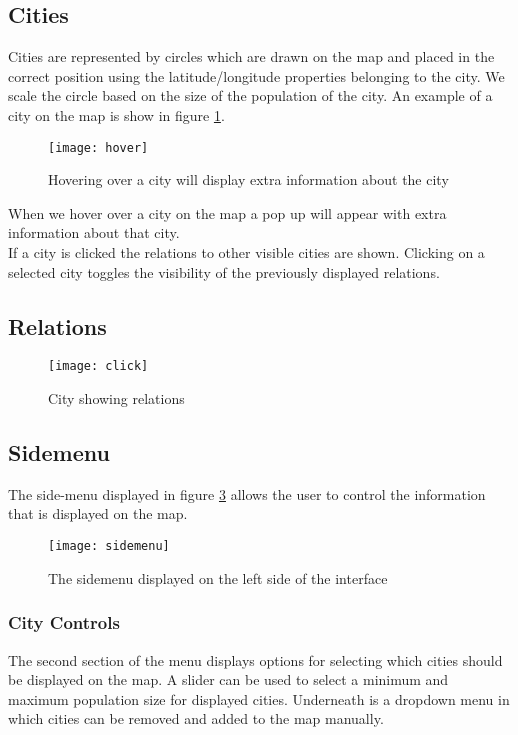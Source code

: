 \subsection{Cities}
Cities are represented by circles which are drawn on the map and placed in the correct position using the latitude/longitude properties belonging to the city. We scale the circle based on the size of the population of the city. An example of a city on the map is show in figure \ref{fig:map-city}.

\begin{figure}[H]
  \centering
  \texttt{[image: hover]}
  \caption{Hovering over a city will display extra information about the city}
  \label{fig:map-city}
\end{figure}

When we hover over a city on the map a pop up will appear with extra information about that city.\\
If a city is clicked the relations to other visible cities are shown. Clicking on a selected city toggles the visibility of the previously displayed relations.

\subsection{Relations}


\begin{figure}[H]
  \centering
  \texttt{[image: click]}
  \caption{City showing relations}
  \label{fig:sub2}
\end{figure}

\subsection{Sidemenu}

The side-menu displayed in figure \ref{fig:sidemenu} allows the user to control the information that is displayed on the map.  

\begin{figure}[H]
    \centering
    \texttt{[image: sidemenu]}
    \caption{The sidemenu displayed on the left side of the interface}
    \label{fig:sidemenu}
\end{figure}


\subsubsection{City Controls}
The second section of the menu displays options for selecting which cities should be displayed on the map. A slider can be used to select a minimum and maximum population size for displayed cities. Underneath is a dropdown menu in which cities can be removed and added to the map manually. 

